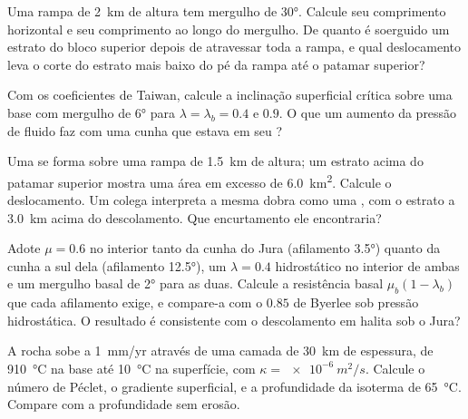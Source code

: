 \begin{exercise}[$\star$]\label{exo:b3:orogenic-wedges:4}
Uma rampa de \qty{2}{km} de altura tem mergulho de \ang{30}. Calcule seu comprimento horizontal e seu
comprimento ao longo do mergulho. De quanto é soerguido um estrato do bloco superior depois de
atravessar toda a rampa, e qual deslocamento leva o corte do estrato mais baixo
do pé da rampa até o patamar superior?
\end{exercise}

\begin{exercise}[$\star\star$]\label{exo:b3:orogenic-wedges:5}
Com os coeficientes de Taiwan, calcule a inclinação superficial crítica sobre uma base
com mergulho de \ang{6} para $\lambda = \lambda_b = 0.4$ e $0.9$. O que um
aumento da pressão de fluido faz com uma cunha que estava em seu ?
\end{exercise}

\begin{exercise}[$\star\star$]\label{exo:b3:orogenic-wedges:6}
Uma  se forma sobre uma rampa de \qty{1.5}{km} de altura; um estrato acima do
patamar superior mostra uma área em excesso de \qty{6.0}{km^2}. Calcule o deslocamento. Um colega
interpreta a mesma dobra como uma , com o estrato a \qty{3.0}{km} acima
do descolamento. Que encurtamento ele encontraria?
\end{exercise}

\begin{exercise}[$\star\star$]\label{exo:b3:orogenic-wedges:7}
Adote $\mu = 0.6$ no interior tanto da cunha do Jura (afilamento \ang{3.5}) quanto da cunha a
sul dela (afilamento \ang{12.5}), um $\lambda = 0.4$ hidrostático no interior de ambas e um
mergulho basal de \ang{2} para as duas. Calcule a resistência basal $\mu_b(1 -
\lambda_b)$ que cada afilamento exige, e compare-a com o $0.85$ de Byerlee
sob pressão hidrostática. O resultado é consistente com o descolamento em
halita sob o Jura?
\end{exercise}

\begin{exercise}[$\star\star$]\label{exo:b3:orogenic-wedges:8}
A rocha sobe a \qty{1}{mm/yr} através de uma camada de \qty{30}{km} de espessura, de
\qty{910}{\celsius} na base até \qty{10}{\celsius} na superfície, com
$\kappa = \qty{e-6}{m^2/s}$. Calcule o número de Péclet, o gradiente superficial,
e a profundidade da isoterma de \qty{65}{\celsius}. Compare com a profundidade
sem erosão.
\end{exercise}

